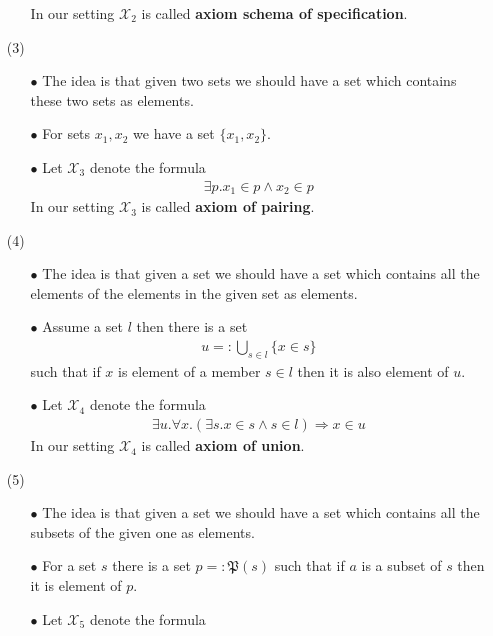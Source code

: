 \begin{enumerate}
\begin{enumerate}
In our setting $\mathcal{X}_{2}$ is called \textbf{axiom schema of specification}.
\end{enumerate}
\item[(3)]
\begin{enumerate}
\item[$\bullet$]
The idea is that given two sets we should have a set which contains these two sets as elements.
\item[$\bullet$]
For sets $x_{1},x_{2}$ we have a set $\lbrace x_{1},x_{2} \rbrace$.
\item[$\bullet$]
Let $\mathcal{X}_{3}$ denote the formula
\begin{align*}
  \exists
  p
  .
  x_{1}
  \in
  p
  \land
  x_{2}
  \in
  p
\end{align*}
In our setting $\mathcal{X}_{3}$ is called \textbf{axiom of pairing}.
\end{enumerate}
\item[(4)]
\begin{enumerate}
\item[$\bullet$]
The idea is that given a set we should have a set which contains all the elements of the elements in the given set as elements.
\item[$\bullet$]
Assume a set $l$ then there is a set
\begin{align*}
  u
  =:
  \bigcup_{s \in l}
  \lbrace
    x
    \in
    s
  \rbrace
\end{align*}
such that if $x$ is element of a member $s \in l$ then it is also element of $u$.
\item[$\bullet$]
Let $\mathcal{X}_{4}$ denote the formula
\begin{align*}
  \exists
  u
  .
  \forall
  x
  .
  \left(
    \exists
    s
    .
    x
    \in
    s
    \land
    s
    \in
    l
  \right)
  \Rightarrow
  x
  \in
  u
\end{align*}
In our setting $\mathcal{X}_{4}$ is called \textbf{axiom of union}.
\end{enumerate}
\item[(5)]
\begin{enumerate}
\item[$\bullet$]
The idea is that given a set we should have a set which contains all the subsets of the given one as elements.
\item[$\bullet$]
For a set $s$ there is a set $p =: \mathfrak{P}(s)$ such that if $a$ is a subset of $s$ then it is element of $p$.
\item[$\bullet$]
  Let $\mathcal{X}_{5}$ denote the formula

\end{enumerate}
\end{enumerate}
